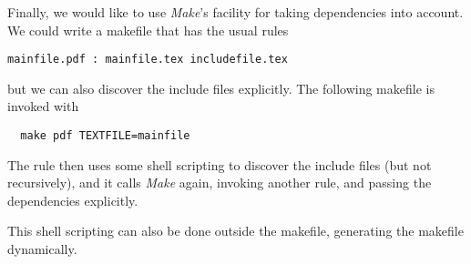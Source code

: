 Finally, we would like to use \emph{Make}'s facility for taking
dependencies into account. 
We could write a makefile that has
the usual rules
\begin{verbatim}
mainfile.pdf : mainfile.tex includefile.tex
\end{verbatim}
but we can also discover the include files explicitly. The following
makefile is invoked with 
\begin{verbatim}
  make pdf TEXTFILE=mainfile
\end{verbatim}
The  rule then uses some shell scripting to discover the
include files (but not recursively), and it calls \emph{Make} again,
invoking another rule, and passing the dependencies explicitly.

This shell scripting can also be done outside the makefile, generating
the makefile dynamically.


\endinput

\Level 0 {Cmake}
\index{Cmake|(textbf}

Makefiles can be cumbersome to make, and they may need customization
for any specific installation. For this reason, \emph{Cmake} is a
build system that first generates the makefiles, which can then be
used in the normal manner.

Here are the main components:
\begin{itemize}
\item The source directory has a file \indextermtt{CMakeLists.txt}
  that describes the structure of the application.
\item Generated files can be kept separate from the source:
\begin{verbatim}
sourcedir=.... # source location
builddir=....  # place for temporaries
installdir=... # here goes the finished stuff
cd ${builddir}
cmake \
  -DCMAKE_PREFIX_PATH=${installdir} \
  ${sourcedir} # do the setup
make           # compile
make install   # move finished stuff in place
\end{verbatim}
\end{itemize}

\Level 1 {Dependency analysis}

Above you learned how \n{Make} can be used for projects with
complicated dependencies. You can tell \n{Cmake} about this using
clauses
\begin{verbatim}
include_directories(include)
file(GLOB SOURCES "*/*.c")
file(GLOB HEADERS "*/*.h")
add_executable(hello_world hello.c ${SOURCES} )
\end{verbatim}
When invoked, \n{Cmake} will then report
\begin{verbatim}
Scanning dependencies of target hello_world
\end{verbatim}
and generate makefiles accordingly.

